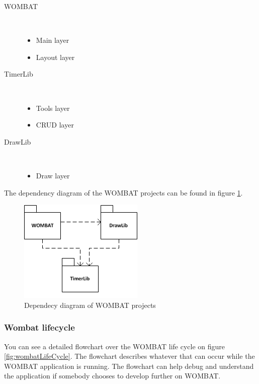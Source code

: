 \begin{description}
  \item[WOMBAT] \hfill \\\begin{itemize}  \item Main layer  \item Layout layer\end{itemize}
  \item[TimerLib] \hfill \\\begin{itemize}  \item Tools layer  \item CRUD layer
\end{itemize}
  \item[DrawLib] \hfill \\\begin{itemize}  \item Draw layer\end{itemize}
\end{description}

The dependency diagram of the WOMBAT projects can be found in figure \ref{fig:LibraryDependency}.

\begin{figure}[H]
	\centering
		\includegraphics[scale=0.6]{Images/Implementation/LibraryDependency.png}
	\caption{Dependecy diagram of WOMBAT projects}
	\label{fig:LibraryDependency}
\end{figure}

\subsubsection{Wombat lifecycle}
You can see a detailed flowchart over the WOMBAT life cycle on figure \ref{fig:wombatLifeCycle}. The flowchart describes whatever that can occur while the WOMBAT application is running. The flowchart can help debug and understand the application if somebody chooses to develop further on WOMBAT.

